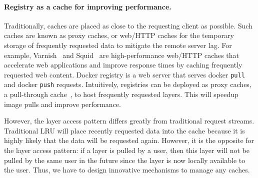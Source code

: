 \paragraph{Registry as a cache for improving performance.}
Traditionally, caches are placed as close to the requesting client as possible. 
Such caches are known as proxy caches, or web/HTTP caches for the temporary storage of 
frequently requested data to mitigate the remote server lag. 
For example, Varnish~\cite{varnish} and Squid~\cite{squid} are high-performance web/HTTP caches that accelerate web applications and improve response times by caching frequently requested web content.
Docker registry is a web server that serves docker \texttt{pull} and docker \texttt{push} requests.
Intuitively, registries can be deployed as proxy caches, \ie a pull-through cache~\cite{registryascache}, to host frequently requested layers. This will speedup image pulls and improve performance. 

However, the layer access pattern differs greatly from traditional request streams.
Traditional LRU will place recently requested data into the cache 
because it is highly likely that the data will be requested again.
However, it is the opposite for the layer access pattern: if a layer is pulled by a user,
then this layer will not be pulled by the same user in the future
since the layer is now locally available to the user. Thus, we have to design innovative mechanisms to manage any caches.





